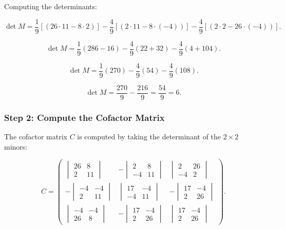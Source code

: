 \documentclass[12pt]{article}
\begin{document}
Computing the determinants:

\[
\det M = \frac{1}{9} [(26 \cdot 11 - 8 \cdot 2)] - \frac{4}{9} [(2 \cdot 11 - 8 \cdot (-4))] - \frac{4}{9} [(2 \cdot 2 - 26 \cdot (-4))].
\]

\[
\det M = \frac{1}{9} (286 - 16) - \frac{4}{9} (22 + 32) - \frac{4}{9} (4 + 104).
\]

\[
\det M = \frac{1}{9} (270) - \frac{4}{9} (54) - \frac{4}{9} (108).
\]

\[
\det M = \frac{270}{9} - \frac{216}{9} = \frac{54}{9} = 6.
\]

\subsubsection*{Step 2: Compute the Cofactor Matrix}

The cofactor matrix \( C \) is computed by taking the determinant of the \( 2 \times 2 \) minors:

\[
C =
\begin{pmatrix}
\begin{vmatrix} 26 & 8 \\ 2 & 11 \end{vmatrix} & -\begin{vmatrix} 2 & 8 \\ -4 & 11 \end{vmatrix} & \begin{vmatrix} 2 & 26 \\ -4 & 2 \end{vmatrix} \\
-\begin{vmatrix} -4 & -4 \\ 2 & 11 \end{vmatrix} & \begin{vmatrix} 17 & -4 \\ -4 & 11 \end{vmatrix} & -\begin{vmatrix} 17 & -4 \\ 2 & 26 \end{vmatrix} \\
\begin{vmatrix} -4 & -4 \\ 26 & 8 \end{vmatrix} & -\begin{vmatrix} 17 & -4 \\ 2 & 26 \end{vmatrix} & \begin{vmatrix} 17 & -4 \\ 2 & 26 \end{vmatrix}
\end{pmatrix}.
\]
\end{document}
